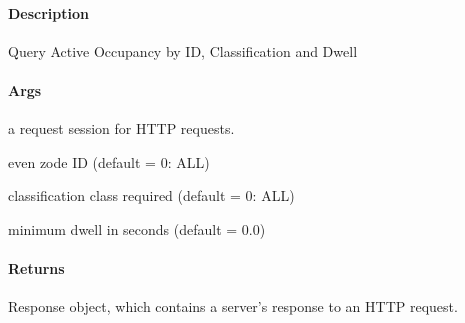 \documentclass[letterpaper,10pt,english]{sphinxmanual}
\begin{document}
\begin{fulllineitems}
\label{\detokenize{gemini_lidar_hub_API:gemini_lidar_hub_API.get_lidar_hub_event_active}}
\pysigstartsignatures
{}
\pysigstopsignatures

\paragraph{Description}
\label{\detokenize{gemini_lidar_hub_API:id11}}
\sphinxAtStartPar
Query Active Occupancy by ID, Classification and Dwell


\paragraph{Args}
\label{\detokenize{gemini_lidar_hub_API:id12}}\begin{description}
\sphinxAtStartPar
a request session for HTTP requests.

\sphinxAtStartPar
even zode ID (default = 0: ALL)

\sphinxAtStartPar
classification class required (default = 0: ALL)

\sphinxAtStartPar
minimum dwell in seconds (default = 0.0)

\end{description}


\paragraph{Returns}
\label{\detokenize{gemini_lidar_hub_API:id13}}\begin{description}
\sphinxAtStartPar
Response object, which contains a server’s response to an HTTP request.

\end{description}

\end{fulllineitems}
\end{document}
